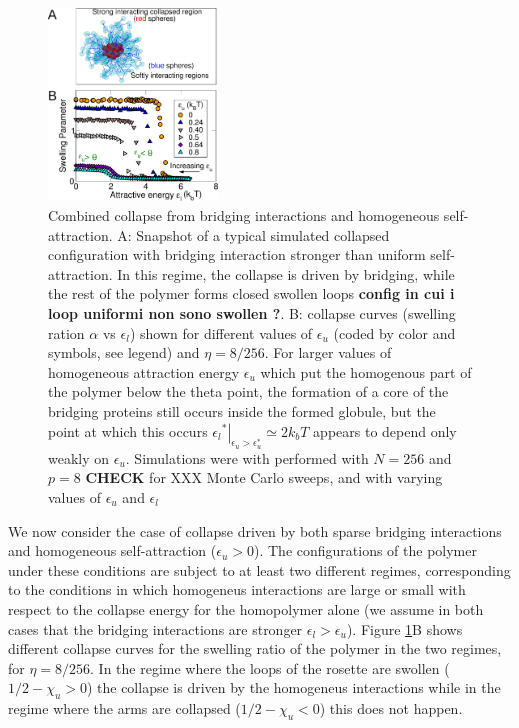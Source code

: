 \documentclass[
preprint,
a4paper,
12pt,
superscriptaddress,
pre]{revtex4}
\begin{document}
\begin{figure}
  \centering
  \includegraphics[width=0.4\textwidth]{fig4}
  \caption{Combined collapse from bridging interactions and
      homogeneous self-attraction.  A: Snapshot of a typical simulated
      collapsed configuration with bridging interaction stronger than
      uniform self-attraction. In this regime, the collapse is driven
      by bridging, 
      while the rest of the polymer forms closed swollen loops
      \textbf{config in cui i loop uniformi non sono swollen ?}.
    B: collapse curves (swelling ration $\alpha$ vs $\epsilon_l$) shown for
    different values of $\epsilon_u$ (coded by color and symbols, see
    legend) and $\eta = 8/256$.
%
    For larger values of homogeneous attraction energy $\epsilon_u$
    which put the homogenous part of the polymer below the theta
    point, the formation of a core  of the bridging proteins still occurs inside
    the formed globule, but the point at which this  occurs
    $\left.{\epsilon_l}^*\right|_{\epsilon_u > \epsilon_u^*} \simeq 2k_bT$
    appears to depend only weakly on $\epsilon_u$.
%
    Simulations were with performed with $N=256$ and $p=8$
    \textbf{CHECK} for XXX Monte Carlo sweeps, and with varying values
    of $\epsilon_u$ and $\epsilon_l$ }
  \label{fig:4}
\end{figure}

We now consider the case of collapse driven by both sparse bridging
interactions and homogeneous self-attraction ($\epsilon_u > 0$).  The
configurations of the polymer under these conditions are subject to at
least two different regimes, corresponding to the conditions in which
homogeneus interactions are large or small with respect to the
collapse energy for the homopolymer alone (we assume in both cases
that the bridging interactions are stronger $\epsilon_l >
\epsilon_u$).
Figure \ref{fig:4}B shows different collapse curves for the swelling
ratio of the polymer in the two regimes, for $\eta = 8/256$. In the
regime where the loops of the rosette are swollen ($1/2 - \chi_u > 0$)
the collapse is driven by the homogeneus interactions while in the
regime where the arms are collapsed ($1/2 - \chi_u < 0$) this does not
happen. 
%
\end{document}
